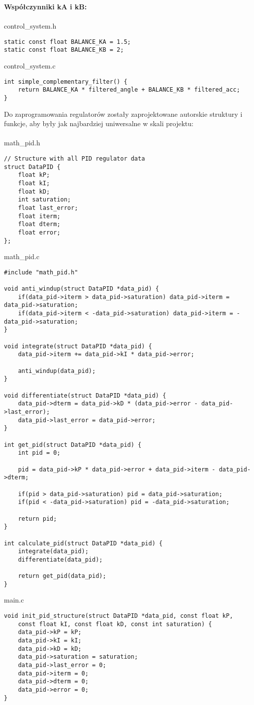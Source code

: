 \documentclass[a4paper,12pt,twoside,openany]{report}
\begin{document}
\noindent\textbf{Współczynniki kA i kB:} \\
\\
\noindent control\_system.h
\begin{lstlisting}[style=customc]
static const float BALANCE_KA = 1.5;
static const float BALANCE_KB = 2;
\end{lstlisting}
control\_system.c
\begin{lstlisting}[style=customc]
int simple_complementary_filter() {
	return BALANCE_KA * filtered_angle + BALANCE_KB * filtered_acc;
}
\end{lstlisting}

Do zaprogramowania regulatorów zostały zaprojektowane autorskie struktury i funkcje, aby były jak najbardziej uniwersalne w skali projektu: \\
\\
\noindent math\_pid.h
\begin{lstlisting}[style=customc]
// Structure with all PID regulator data
struct DataPID {
	float kP;
	float kI;
	float kD;
	int saturation;
	float last_error;
	float iterm;
	float dterm;
	float error;
};
\end{lstlisting}
math\_pid.c
\begin{lstlisting}[style=customc]
#include "math_pid.h"

void anti_windup(struct DataPID *data_pid) {
	if(data_pid->iterm > data_pid->saturation) data_pid->iterm = data_pid->saturation;
	if(data_pid->iterm < -data_pid->saturation) data_pid->iterm = -data_pid->saturation;
}

void integrate(struct DataPID *data_pid) {
	data_pid->iterm += data_pid->kI * data_pid->error;
	
	anti_windup(data_pid);
}

void differentiate(struct DataPID *data_pid) {
	data_pid->dterm = data_pid->kD * (data_pid->error - data_pid->last_error);
	data_pid->last_error = data_pid->error;
}

int get_pid(struct DataPID *data_pid) {
	int pid = 0;
	
	pid = data_pid->kP * data_pid->error + data_pid->iterm - data_pid->dterm;
	
	if(pid > data_pid->saturation) pid = data_pid->saturation;
	if(pid < -data_pid->saturation) pid = -data_pid->saturation;
	
	return pid;
}

int calculate_pid(struct DataPID *data_pid) {
	integrate(data_pid);
	differentiate(data_pid);
	
	return get_pid(data_pid);
}
\end{lstlisting}
main.c
\begin{lstlisting}[style=customc]
void init_pid_structure(struct DataPID *data_pid, const float kP, 
    const float kI, const float kD, const int saturation) {
	data_pid->kP = kP;
	data_pid->kI = kI;
	data_pid->kD = kD;
	data_pid->saturation = saturation;
	data_pid->last_error = 0;
	data_pid->iterm = 0;
	data_pid->dterm = 0;
	data_pid->error = 0;
}
\end{lstlisting}
\end{document}
